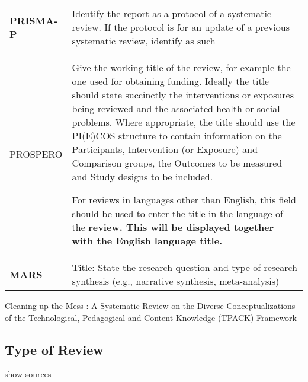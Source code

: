 \documentclass[
]{article}
\begin{document}
\hypertarget{wt}{}
\begin{collapse}

\begin{table}[H]
\centering
\begin{tabular}{>{}l|l}
\hline
\cellcolor[HTML]{ececec}{source} & \cellcolor[HTML]{ececec}{description}\\
\hline
\textbf{PRISMA-P} & Identify the report as a protocol of a systematic review. If the protocol is for an update of a previous systematic review, identify as such\\
\hline
PROSPERO & Give the working title of the review, for example the one used for obtaining funding. Ideally the title should state succinctly the interventions or exposures being reviewed and the associated health or social problems. Where appropriate, the title should use the PI(E)COS structure to contain information on the Participants, Intervention (or Exposure) and Comparison groups, the Outcomes to be measured and Study designs to be included.

For reviews in languages other than English, this field should be used to enter the title in the language of the
\textbf{review. This will be displayed together with the English language title.}\\
\hline
\textbf{MARS} & Title: State the research question and type of research synthesis (e.g., narrative synthesis, meta-analysis)\\
\hline
\end{tabular}
\end{table}

\end{collapse}

Cleaning up the Mess : A Systematic Review on the Diverse
Conceptualizations of the Technological, Pedagogical and Content
Knowledge (TPACK) Framework

\hypertarget{type-of-review}{%
\subsection{Type of Review}\label{type-of-review}}

show sources
\end{document}
